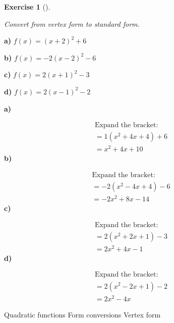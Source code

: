 \documentclass[
  letterpaper,
  DIV=11,
  numbers=noendperiod]{scrreprt}
\theoremstyle{definition}
\newtheorem{exercise}{Exercise}[chapter]
\theoremstyle{remark}
\begin{document}
\begin{exercise}[]\protect\hypertarget{exr-u7-21}{}\label{exr-u7-21}

\emph{Convert from vertex form to standard form.}

\textbf{a)} \(\displaystyle f(x) = (x + 2)^2 + 6\)

\textbf{b)} \(\displaystyle f(x) = -2(x - 2)^2 - 6\)

\textbf{c)} \(\displaystyle f(x) = 2(x + 1)^2 - 3\)

\textbf{d)} \(\displaystyle f(x) = 2(x - 1)^2 - 2\)

\begin{tcolorbox}[enhanced jigsaw, opacitybacktitle=0.6, coltitle=black, arc=.35mm, colframe=quarto-callout-tip-color-frame, colback=white, bottomrule=.15mm, left=2mm, colbacktitle=quarto-callout-tip-color!10!white, titlerule=0mm, opacityback=0, title=\textcolor{quarto-callout-tip-color}{\faLightbulb}\hspace{0.5em}{🔍 View Solutions}, leftrule=.75mm, breakable, rightrule=.15mm, bottomtitle=1mm, toptitle=1mm, toprule=.15mm]

\textbf{a)}

\[
\begin{aligned}
\text{Expand the bracket:} \\[4pt] = 1(x^2 + 4x + 4) + 6 \\[4pt] = x^2 + 4x + 10
\end{aligned}
\] \textbf{b)}

\[
\begin{aligned}
\text{Expand the bracket:} \\[4pt] = -2(x^2 - 4x + 4) - 6 \\[4pt] = -2x^2 + 8x - 14
\end{aligned}
\] \textbf{c)}

\[
\begin{aligned}
\text{Expand the bracket:} \\[4pt] = 2(x^2 + 2x + 1) - 3 \\[4pt] = 2x^2 + 4x - 1
\end{aligned}
\] \textbf{d)}

\[
\begin{aligned}
\text{Expand the bracket:} \\[4pt] = 2(x^2 - 2x + 1) - 2 \\[4pt] = 2x^2 - 4x
\end{aligned}
\]

\end{tcolorbox}

{Quadratic functions} {Form conversions} {Vertex form}

\end{exercise}
\end{document}

